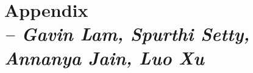 \chapter{Appendix \\
\small{\textit{-- Gavin Lam, Spurthi Setty, Annanya Jain, Luo Xu}}
\label{Chapter::Appendix}}